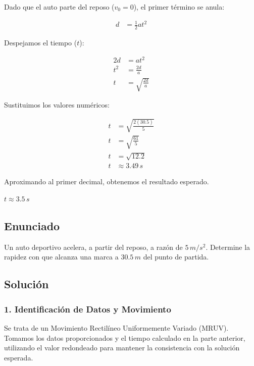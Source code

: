 \documentclass[12pt, a4paper]{article}
\begin{document}
Dado que el auto parte del reposo ($v_0 = 0$), el primer término se anula:

\begin{align*}
d &= \frac{1}{2} a t^2
\end{align*}

Despejamos el tiempo ($t$):

\begin{align*}
2d &= a t^2 \\
t^2 &= \frac{2d}{a} \\
t &= \sqrt{\frac{2d}{a}}
\end{align*}

Sustituimos los valores numéricos:

\begin{align*}
t &= \sqrt{\frac{2(30.5)}{5}} \\
t &= \sqrt{\frac{61}{5}} \\
t &= \sqrt{12.2} \\
t &\approx 3.49 \, \si{s}
\end{align*}

Aproximando al primer decimal, obtenemos el resultado esperado.

\begin{tcolorbox}[colback=green!5!white, colframe=green!50!black, title=Respuesta Final]
\centering \Large $t \approx 3.5 \, \si{s}$
\end{tcolorbox}

\newpage

\subsection*{Enunciado}
Un auto deportivo acelera, a partir del reposo, a razón de $5 \, \si{m/s^2}$. Determine la rapidez con que alcanza una marca a $30.5 \, \si{m}$ del punto de partida.

\subsection*{Solución}

\subsubsection*{1. Identificación de Datos y Movimiento}
Se trata de un Movimiento Rectilíneo Uniformemente Variado (MRUV). Tomamos los datos proporcionados y el tiempo calculado en la parte anterior, utilizando el valor redondeado para mantener la consistencia con la solución esperada.
\end{document}
